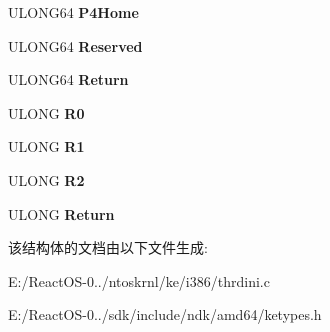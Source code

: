 \begin{DoxyCompactItemize}
\mbox{\label{struct___k_s_t_a_r_t___f_r_a_m_e_ac1c5a2a55da44cb5794f5220757fe78e}} 
U\+L\+O\+N\+G64 {\bfseries P4\+Home}
\item 
\mbox{\label{struct___k_s_t_a_r_t___f_r_a_m_e_a392a85301c7f89728794355959e0be66}} 
U\+L\+O\+N\+G64 {\bfseries Reserved}
\item 
\mbox{\label{struct___k_s_t_a_r_t___f_r_a_m_e_a71b86f482251833fde51cab3a7922b17}} 
U\+L\+O\+N\+G64 {\bfseries Return}
\item 
\mbox{\label{struct___k_s_t_a_r_t___f_r_a_m_e_ac1ee1fade53dc0af3360e7ba36448638}} 
U\+L\+O\+NG {\bfseries R0}
\item 
\mbox{\label{struct___k_s_t_a_r_t___f_r_a_m_e_a699d32668d02a2583deac7591fa344be}} 
U\+L\+O\+NG {\bfseries R1}
\item 
\mbox{\label{struct___k_s_t_a_r_t___f_r_a_m_e_aa258a565a71d911fd32425743111ddde}} 
U\+L\+O\+NG {\bfseries R2}
\item 
\mbox{\label{struct___k_s_t_a_r_t___f_r_a_m_e_a5967cf8ffd132178b3de28f72c1ba28c}} 
U\+L\+O\+NG {\bfseries Return}
\end{DoxyCompactItemize}


该结构体的文档由以下文件生成\+:\begin{DoxyCompactItemize}
\item 
E\+:/\+React\+O\+S-\/0../ntoskrnl/ke/i386/thrdini.\+c\item 
E\+:/\+React\+O\+S-\/0../sdk/include/ndk/amd64/ketypes.\+h\end{DoxyCompactItemize}
